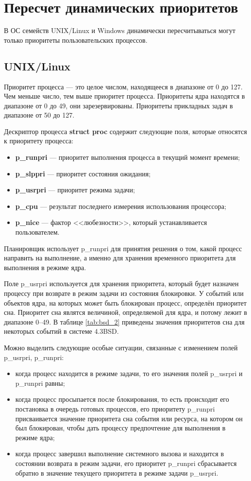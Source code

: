 \chapter{Пересчет динамических приоритетов}

В ОС семейств UNIX/Linux и Windows динамически пересчитываться могут только приоритеты пользовательских процессов.

\section{UNIX/Linux}

Приоритет процесса --- это целое числом, находящееся в диапазоне от 0 до 127.
Чем меньше число, тем выше приоритет процесса.
Приоритеты ядра находятся в диапазоне от 0 до 49, они зарезервированы.
Приоритеты прикладных задач в диапазоне от 50 до 127.

Дескриптор процесса \textbf{struct proc} содержит следующие поля, которые относятся к приоритету процесса:
\begin{itemize}
	\item \textbf{p\_runpri} --- приоритет выполнения процесса в текущий момент времени;
	\item \textbf{p\_slppri} --- приоритет состояния ожидания;
	\item \textbf{p\_usrpri} --- приоритет режима задачи;
	\item \textbf{p\_cpu} --- результат последнего измерения использования процессора;
	\item \textbf{p\_nice} --- фактор <<любезности>>, который устанавливается пользователем.
\end{itemize}

Планировщик использует p\_runpri для принятия решения о том, какой процесс направить на выполнение, а именно для хранения временного приоритета для выполнения в режиме ядра.

Поле p\_usrpri используется для хранения приоритета, который будет назначен процессу при возврате в режим задачи из состояния блокировки.
У событий или объектов ядра, на которых может быть блокирован процесс, определён приоритет сна. 
Приоритет сна являтся величиной, определяемой для ядра, и потому лежит в диапазоне 0--49.
В таблице \ref{tab:bsd_2} приведены значения приоритетов сна для некоторых событий в системе 4.3BSD.

Можно выделить следующие особые ситуации, связанные с изменением
полей p\_usrpri, p\_runpri:
\begin{itemize}
	\item когда процесс находится в режиме задачи, то его значения полей p\_usrpri и p\_runpri равны;
	\item  когда процесс просыпается после блокирования, то есть происходит его постановка в очередь готовых процессов, его приоритету p\_runpri присваивается значение приоритета сна события или ресурса, на котором он был блокирован, чтобы дать процессу предпочтение для выполнения в режиме ядра;
	\item когда процесс завершил выполнение системного вызова и находится в состоянии возврата в режим задачи, его приоритет p\_runpri сбрасывается обратно в значение текущего приоритета в режиме задачи p\_usrpri.
\end{itemize}

